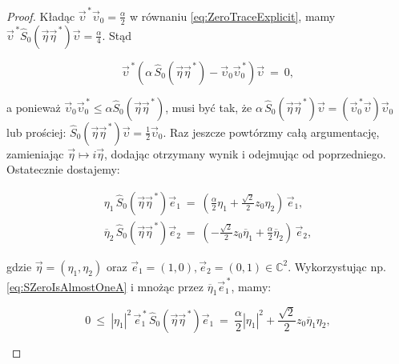 {\begin{proof}
Kładąc $\vec{\upsilon}^{\,*} \vec{\upsilon}_{0} = \frac{\alpha}{2}$
w równaniu \eqref{eq:ZeroTraceExplicit}, mamy
$
\vec{\upsilon}^{\,*} \hat{S}_{0}(\vec{\eta} \vec{\eta}^{\,*}) \vec{\upsilon} =
\frac{\alpha}{4}
$.
Stąd
\begin{linenomath*}
 \begin{equation}
 \vec{\upsilon}^{\,*} \left(
    \alpha \, \hat{S}_{0}(\vec{\eta} \vec{\eta}^{\,*}) -\vec{\upsilon}_{0} \vec{\upsilon}_{0}^{\,*}
  \right) \vec{\upsilon} \: = \: 0,
 \end{equation}
\end{linenomath*}
a ponieważ
$\vec{\upsilon}_{0} \vec{\upsilon}_{0}^{\,*} \leq  \alpha \hat{S}_{0}(\vec{\eta} \vec{\eta}^{\,*})$,
musi być tak, że
$ \alpha \, \hat{S}_{0}(\vec{\eta} \vec{\eta}^{\,*}) \vec{\upsilon} =
\left( \vec{\upsilon}_{0}^{\,*} \vec{\upsilon} \right)  \vec{\upsilon}_{0}$
lub prościej:
$ \hat{S}_{0}(\vec{\eta} \vec{\eta}^{\,*}) \vec{\upsilon} = \frac{1}{2} \vec{\upsilon}_{0}$.
Raz jeszcze powtórzmy całą argumentację, zamieniając
$\vec{\eta} \mapsto i \vec{\eta}$,
dodając otrzymany wynik i odejmując od poprzedniego.
Ostatecznie dostajemy:
\begin{linenomath*}
 \begin{subequations}
    \begin{align}
\label{eq:SZeroIsAlmostOneA}
\eta_{1} \, \hat{S}_{0}(\vec{\eta} \vec{\eta}^{\,*}) \vec{e}_{1} \: = \:
   \left( \frac{\alpha}{2} \eta_{1} + \frac{\sqrt{2}}{2} z_{0} \eta_{2} \right) \, \vec{e}_{1}, \\
\label{eq:SZeroIsAlmostOneB}
\overline{\eta}_{2} \, \hat{S}_{0}(\vec{\eta} \vec{\eta}^{\,*}) \vec{e}_{2} \: = \:
   \left(- \frac{\sqrt{2}}{2} z_{0} \overline{\eta}_{1} + \frac{\alpha}{2} \overline{\eta}_{2} \right)
       \, \vec{e}_{2},
    \end{align}
 \end{subequations}
\end{linenomath*}
gdzie $\vec{\eta} = (\eta_{1}, \eta_{2})$ oraz
$\vec{e}_{1} = (1,0), \vec{e}_{2} = (0,1) \in \mathbb{C}^{2}$.
Wykorzystując np. \eqref{eq:SZeroIsAlmostOneA}
i mnożąc przez  $\overline{\eta}_{1} \vec{e}_{1}^{\,*}$,
mamy:
\begin{linenomath*}
 \begin{equation}
0 \: \leq \:
 |\eta_{1}|^{2} \, \vec{e}_{1}^{\,*} \, \hat{S}_{0}(\vec{\eta} \vec{\eta}^{\,*}) \vec{e}_{1}
 \: = \:
\frac{\alpha}{2} |\eta_{1}|^{2} + \frac{\sqrt{2}}{2} z_{0} \overline{\eta}_{1} \eta_{2},
 \end{equation}
\end{linenomath*}

\end{proof}}
